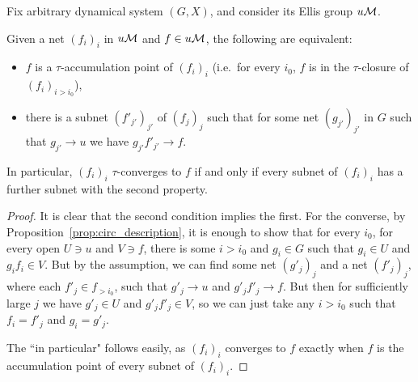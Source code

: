 	\begin{lem}
		\label{lem:tau_accumulation}
		Fix arbitrary dynamical system $(G,X)$, and consider its Ellis group $u{\mathcal M}$.
		
		Given a net $(f_i)_i$ in $u{\mathcal M}$ and $f\in u{\mathcal M}$, the following are equivalent:
		\begin{itemize}
			\item
			$f$ is a $\tau$-accumulation point of $(f_i)_i$ (i.e.\ for every $i_0$, $f$ is in the $\tau$-closure of $(f_i)_{i>i_0}$),
			\item
			there is a subnet $(f'_{j'})_{j'}$ of $(f_j)_j$ such that for some net $(g_{j'})_{j'}$ in $G$ such that $g_{j'}\to u$ we have $g_{j'}f'_{j'}\to f$.
		\end{itemize}
		In particular, $(f_i)_i$ $\tau$-converges to $f$ if and only if every subnet of $(f_i)_i$ has a further subnet with the second property.
	\end{lem}
	\begin{proof}
		It is clear that the second condition implies the first. For the converse, by Proposition~\ref{prop:circ_description}, it is enough to show that for every $i_0$, for every open $U\ni u$ and $V\ni f$, there is some $i>i_0$ and $g_i\in G$ such that $g_i\in U$ and $g_if_i\in V$. But by the assumption, we can find some net $(g'_j)_j$ and a net $(f'_j)_j$, where each $f'_j\in f_{>{i_0}}$, such that $g'_j\to u$ and $g'_jf'_j\to f$. But then for sufficiently large $j$ we have $g'_j\in U$ and $g'_jf'_j\in V$, so we can just take any $i>i_0$ such that $f_i=f'_j$ and $g_i=g'_j$.
		
		The ``in particular" follows easily, as $(f_i)_i$ converges to $f$ exactly when $f$ is the accumulation point of every subnet of $(f_i)_i$.
	\end{proof}
	
